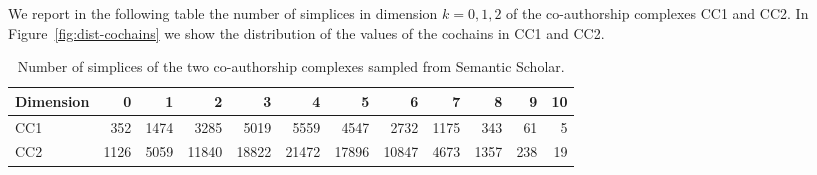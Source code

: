 We report in the following table the number of simplices in dimension $k=0,1,2$ of the co-authorship complexes CC1 and CC2. In Figure~\ref{fig:dist-cochains} we show the distribution of the values of the cochains in CC1 and CC2.
\begin{table}[htbp]
  \centering
  \scriptsize{
  \begin{tabular}{lrrrrrrrrrrr}
    \toprule
    Dimension   & 0     & 1  & 2     & 3 & 4     & 5 & 6    & 7 & 8   & 9 & 10\\
    \midrule
    CC1 & 352  & 1474  & 3285  & 5019  & 5559  & 4547  & 2732  & 1175  & 343 & 61 & 5\\
    CC2 & 1126 & 5059 & 11840 & 18822 & 21472 & 17896  & 10847 & 4673 & 1357 & 238 & 19\\
    \bottomrule
  \end{tabular}}
  \vspace{2pt}
  \caption{%
  Number of simplices of the two co-authorship complexes sampled from Semantic Scholar.
  } \label{table:Simplices-coauthor}
\end{table}

